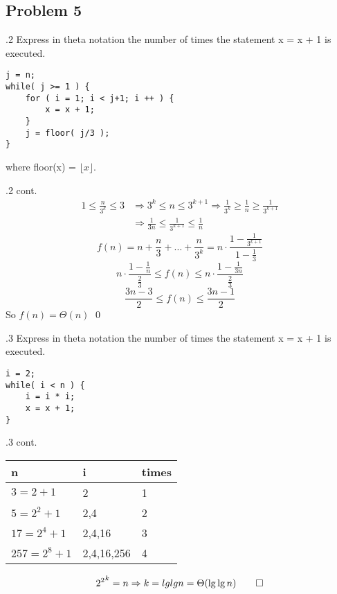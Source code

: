 \documentclass[
               handout,
               ]{beamer}
\begin{document}
    \subsection{Problem 5}
    
        \begin{frame}[fragile]{\subsecname.2}
            Express in theta notation the number of times the statement x = x + 1 is
executed.
            \begin{lstlisting}
j = n;
while( j >= 1 ) {
    for ( i = 1; i < j+1; i ++ ) {
        x = x + 1;
    }
    j = floor( j/3 );
}
            \end{lstlisting}
            where floor(x) = $\lfloor x\rfloor$.
\end{frame} 

    
        \begin{frame}[c]{\subsecname.2 cont.}
            \begin{align*}
            1\leq\frac{n}{3^k}\leq3&\Rightarrow3^k\leq n\leq3^{k+1}  \Rightarrow\frac{1}{3^k}\geq\frac{1}{n}\geq\frac{1}{3^{k+1}}\\
                                   &\Rightarrow \frac{1}{3n}\leq\frac{1}{3^{k+1}}\leq\frac{1}{n}
            \end{align*}
            \[f(n)=n+\frac{n}{3}+\ldots+\frac{n}{3^k}=n\cdot\frac{1-\frac{1}{3^{k+1}}}{1-\frac{1}{3}}\]
            \[n\cdot\frac{1-\frac{1}{n}}{\frac{2}{3}}\leq f(n)\leq n\cdot\frac{1-\frac{1}{3n}}{\frac{2}{3}}\]
            \[\frac{3n-3}{2}\leq f(n)\leq\frac{3n-1}{2}\]
            So $f(n)=\Theta(n)$ \qed
        \end{frame}
    
        \begin{frame}[fragile]{\subsecname.3}
            Express in theta notation the number of times the statement x = x + 1 is
executed.
            \begin{lstlisting}
i = 2;
while( i < n ) {
    i = i * i;
    x = x + 1;
}
            \end{lstlisting}
\end{frame}
    
        \begin{frame}[c]{\subsecname.3 cont.}
            \begin{center}
            \begin{tabular}{lll}
                    \hline%
                    n               & i          & times   \\\hline%
                    $3=2+1      $   & 2          & 1       \\
                    $5=2^2+1    $   & 2,4        & 2       \\
                    $17=2^4+1   $   & 2,4,16     & 3       \\
                    $257=2^8+1  $   & 2,4,16,256 & 4       \\\hline%
            \end{tabular}\pause
            \end{center}
            \[{2^2}^k = n \Rightarrow k=lg{lg{n}}=\Theta(\lg{\lg{n}}) \qed\]
        \end{frame}
\end{document}
